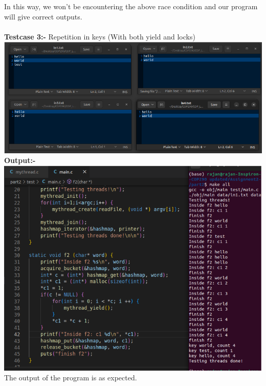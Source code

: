 \documentclass[12pt]{article}
\begin{document}
\begin{spacing}{1.2}
In this way, we won’t be encountering the above race condition and our program will give correct outputs.\\
\\
    \newpage
\textbf{Testcase 3:-} Repetition in keys (With both yield and locks)\\
\includegraphics[width=20cm]{images/26.png}\\
\textbf{Output:-}\\
\includegraphics[width=20cm]{images/27.png}\\
The output of the program is as expected.
    \newpage


\end{spacing}
\end{document}
